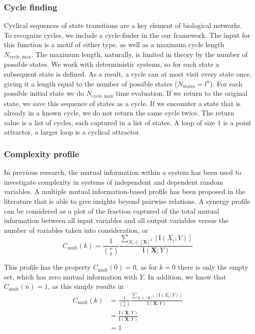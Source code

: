 \documentclass[../main.tex]{subfiles}
\begin{document}
\subsubsection{Cycle finding}

Cyclical sequences of state transitions are a key element of biological networks. %
To recognize cycles, we include a cycle-finder in the our framework.
The input for this function is a motif of either type, as well as a maximum cycle length $N_\mathrm{cycle,max}$.
The maximum length, naturally, is limited in theory by the number of possible states.
We work with deterministic systems, so for each state a subsequent state is defined.
As a result, a cycle can at most visit every state once, giving it a length equal to the number of possible states ($N_\mathrm{states} = l^n$).
For each possible initial state we do $N_\mathrm{cycle,max}$ time evaluation.
If we return to the original state, we save this sequence of states as a cycle.
If we encounter a state that is already in a known cycle, we do not return the same cycle twice.
The return value is a list of cycles, each captured in a list of states.
A loop of size 1 is a point attractor, a larger loop is a cyclical attractor. 

\subsubsection{Complexity profile}

In previous research, the mutual information within a system has been used to investigate complexity in systems of independent and dependent random variables.
A multiple mutual information-based profile has been proposed in the literature that is able to give insights beyond pairwise relations.
A synergy profile can be considered as a plot of the fraction captured of the total mutual information between all input variables and all output variables versus the number of variables taken into consideration, or
%
\begin{equation}
C_\mathrm{mult}(k) = \frac{1}{\binom{n}{k}}\frac{\sum_{X_i \in [\mathbf{X}]^k} [\mathrm{I}\left( X_i;Y \right)]}{\mathrm{I}\left( \mathbf{X};Y\right)}
\end{equation}

This profile has the property $C_\mathrm{mult}\left( 0 \right) = 0$, as for $k = 0$ there is only the empty set, which has zero mutual information with $Y$.
In addition, we know that $C_\mathrm{mult}\left( n\right) = 1$, as this simply results in
%
\begin{align}
C_\mathrm{mult}\left( k \right)  
&= \frac{1}{\binom{n}{k}}\frac{\sum_{X_i \in [\mathbf{X}]^k} [\mathrm{I}\left( X_i;Y\right)]}{\mathrm{I}\left( \mathbf{X};Y\right)} \\
&= \frac{\mathrm{I}\left( \mathbf{X};Y\right)}{\mathrm{I}\left( \mathbf{X};Y\right)} \\
&= 1
\end{align}
\end{document}
